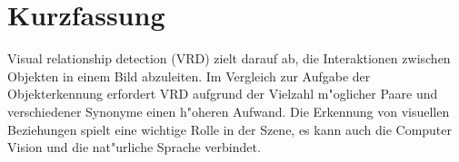 %
% 


\chapter*{Kurzfassung}


\label{chap:Kurzfassung}

Visual relationship detection (VRD) zielt darauf ab, die Interaktionen zwischen Objekten in einem Bild abzuleiten. Im Vergleich zur Aufgabe der Objekterkennung erfordert VRD aufgrund der Vielzahl m"oglicher Paare und verschiedener Synonyme einen h"oheren Aufwand. Die Erkennung von visuellen Beziehungen spielt eine wichtige Rolle in der Szene, es kann auch die Computer Vision und die nat"urliche Sprache verbindet.

